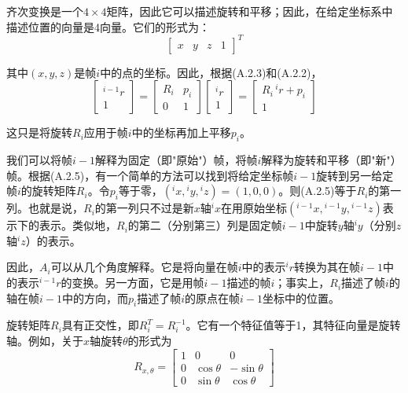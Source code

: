 \documentclass[UTF8,a4paper]{ctexart}
\begin{document}
齐次变换是一个$4\times 4$矩阵，因此它可以描述旋转和平移；因此，在给定坐标系中描述位置的向量是4向量。它们的形式为：
\begin{equation}
\begin{bmatrix} x & y & z & 1 \end{bmatrix}^T
\tag{A.2.4}
\end{equation}

其中$(x, y, z)$是帧$i$中的点的坐标。因此，根据(A.2.3)和(A.2.2)，
\begin{equation}
\begin{bmatrix} {}^{i-1}r \\ 1 \end{bmatrix} = \begin{bmatrix} R_i & p_i \\ 0 & 1 \end{bmatrix} \begin{bmatrix} {}^ir \\ 1 \end{bmatrix} = \begin{bmatrix} R_i \, {}^ir + p_i \\ 1 \end{bmatrix}
\tag{A.2.5}
\end{equation}

这只是将旋转$R_i$应用于帧$i$中的坐标再加上平移$p_i$。

我们可以将帧$i-1$解释为固定（即"原始"）帧，将帧$i$解释为旋转和平移（即"新"）帧。根据(A.2.5)，有一个简单的方法可以找到将给定坐标帧$i-1$旋转到另一给定帧$i$的旋转矩阵$R_i$。令$p_i$等于零，$({}^ix, {}^iy, {}^iz)=(1,0,0)$。则(A.2.5)等于$R_i$的第一列。也就是说，$R_i$的第一列只不过是新$x$轴${}^ix$在用原始坐标$({}^{i-1}x, {}^{i-1}y, {}^{i-1}z)$表示下的表示。类似地，$R_i$的第二（分别第三）列是固定帧$i-1$中旋转$y$轴${}^iy$（分别$z$轴${}^iz$）的表示。

因此，$A_i$可以从几个角度解释。它是将向量在帧$i$中的表示${}^ir$转换为其在帧$i-1$中的表示${}^{i-1}r$的变换。另一方面，它是用帧$i-1$描述的帧$i$；事实上，$R_i$描述了帧$i$的轴在帧$i-1$中的方向，而$p_i$描述了帧$i$的原点在帧$i-1$坐标中的位置。

旋转矩阵$R_i$具有正交性，即$R_i^T = R_i^{-1}$。它有一个特征值等于1，其特征向量是旋转轴。例如，关于$x$轴旋转$\theta$的形式为
\begin{equation}
R_{x,\theta} = \begin{bmatrix} 1 & 0 & 0 \\ 0 & \cos\theta & -\sin\theta \\ 0 & \sin\theta & \cos\theta \end{bmatrix}
\tag{A.2.6}
\end{equation}
\end{document}
